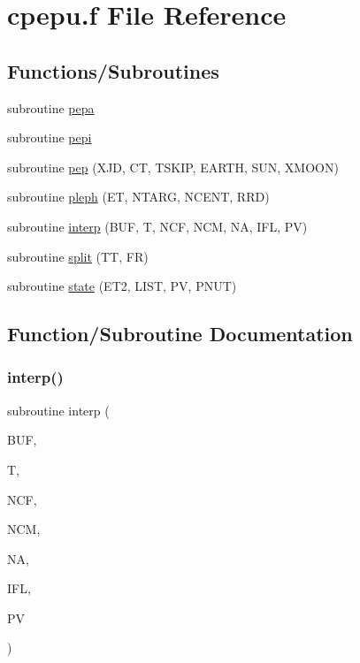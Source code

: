 \hypertarget{cpepu_8f}{}\section{cpepu.\+f File Reference}
\label{cpepu_8f}
\subsection*{Functions/\+Subroutines}
\begin{DoxyCompactItemize}
\item 
subroutine \hyperlink{cpepu_8f_a4990ddf7cb013fe6cd08d5bb49a55122}{pepa}
\item 
subroutine \hyperlink{cpepu_8f_ab45e4e9029c53c9b090b899afccef340}{pepi}
\item 
subroutine \hyperlink{cpepu_8f_a5a9f77cb0d3259a84a37bf8ddf805115}{pep} (X\+JD, CT, T\+S\+K\+IP, E\+A\+R\+TH, S\+UN, X\+M\+O\+ON)
\item 
subroutine \hyperlink{cpepu_8f_aedc7e0a9526045bd01307271228e14a3}{pleph} (ET, N\+T\+A\+RG, N\+C\+E\+NT, R\+RD)
\item 
subroutine \hyperlink{cpepu_8f_afa02d9d30fb5a5291d7e46b48dae5f4c}{interp} (B\+UF, T, N\+CF, N\+CM, NA, I\+FL, PV)
\item 
subroutine \hyperlink{cpepu_8f_aab78822781152ab32cf6414e6baf07ff}{split} (TT, FR)
\item 
subroutine \hyperlink{cpepu_8f_aef334eeeabb72d23bbc1583a80460182}{state} (E\+T2, L\+I\+ST, PV, P\+N\+UT)
\end{DoxyCompactItemize}


\subsection{Function/\+Subroutine Documentation}
\mbox{\label{cpepu_8f_afa02d9d30fb5a5291d7e46b48dae5f4c}} 
\subsubsection{\texorpdfstring{interp()}{interp()}}
{\footnotesize\ttfamily subroutine interp (\begin{DoxyParamCaption}\item[{real$\ast$8, dimension(ncf,ncm,$\ast$)}]{B\+UF,  }\item[{real$\ast$8, dimension(2)}]{T,  }\item[{integer$\ast$4}]{N\+CF,  }\item[{integer$\ast$4}]{N\+CM,  }\item[{integer$\ast$4}]{NA,  }\item[{integer$\ast$4}]{I\+FL,  }\item[{real$\ast$8, dimension(ncm,$\ast$)}]{PV }\end{DoxyParamCaption})}



